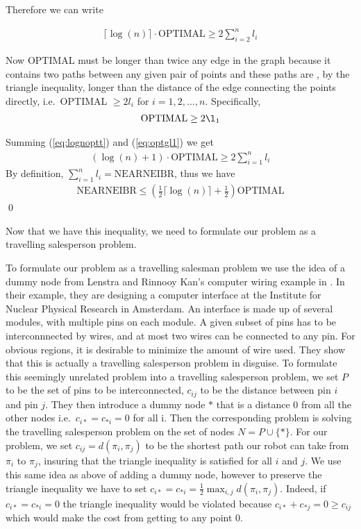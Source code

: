 Therefore we can write

\begin{align}
\lceil \log(n) \rceil \cdot \text{OPTIMAL} \geq 2 \sum_{i = 2}^n l_i \label{eq:lognoptt}
\end{align}

Now OPTIMAL must be longer than twice any edge in the graph because it contains two paths between any given pair of points and these paths are , by the triangle  inequality, longer than the distance of the edge connecting the points directly, i.e.\ OPTIMAL $\geq 2 l_i$ for $i = 1,2,\dots, n$. Specifically,
\begin{align}
\text{OPTIMAL} \geq 2 \l_1 \label{eq:optgl1}
\end{align}

Summing (\ref{eq:lognoptt}) and (\ref{eq:optgl1}) we get 
\begin{align*}
(\log(n)+1) \cdot \text{OPTIMAL} \geq 2 \sum_{i=1}^n l_i
\end{align*}
By definition, $\sum_{i=1}^n l_i = \text{NEARNEIBR}$, thus we have 
\begin{align*}
\text{NEARNEIBR} \leq (\frac{1}{2} \lceil \log(n) \rceil + \frac{1}{2}) \text{OPTIMAL}
\end{align*}
\qed 

Now that we have this inequality, we need to formulate our problem as a travelling salesperson problem.

To formulate our problem as a travelling salesman problem we use the idea of a dummy node from Lenstra and Rinnooy Kan's computer wiring example in \cite{lenstra75}. In their example, they are designing a computer interface at the Institute for Nuclear Physical Research in Amsterdam. An interface is made up of several modules, with multiple pins on each module. A given subset of pins has to be interconnnected by wires, and at most two wires can be connected to any pin. For obvious regions, it is desirable to minimize the amount of wire used. They show that this is actually a travelling salesperson problem in disguise. To formulate this seemingly unrelated problem into a travelling salesperson problem, we set $P$ to be the set of pins to be interconnected, $c_{ij}$ to be the distance between pin $i$ and pin $j$. They then introduce a dummy node $*$ that is a distance 0 from all the other nodes i.e.\ $c_{i*} = c_{*i} = 0$ for all i. Then the corresponding problem is solving the travelling salesperson problem on the set of nodes $N=P \cup \{*\}$. For our problem, we set $c_{ij}=d(\pi_i , \pi_j)$ to be the shortest path our robot can take from $\pi_i$ to $\pi_j$, insuring that the triangle inequality is satisfied for all $i$ and $j$. We use this same idea as above of adding a dummy node, however to preserve the triangle inequality we have to set $c_{i*} = c_{*i} = \frac{1}{2} \max_{i,j} d(\pi_i , \pi_j)$. Indeed, if $c_{i*} = c_{*i} = 0 $ the triangle inequality would be violated because $c_{i*} + c_{*j} = 0 \geq c_{ij}$ which would make the cost from getting to any point 0. 

